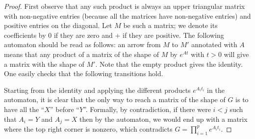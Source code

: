 \documentclass[format=acmsmall, review=false, screen=true]{acmart}
\begin{document}
\begin{proof}
First observe that any such product is always an upper triangular matrix with
non-negative entries (because all the matrices have non-negative entries) and positive
entries on the diagonal. Let $M$ be such a matrix; we denote its coefficients by
$0$ if they are zero and $+$ if they are positive.
The following automaton should be read as follows: an arrow from $M$ to $M'$ annotated with $A$ means that any product
of a matrix of the shape of $M$ by $e^{At}$ with $t>0$ will give a matrix with the shape of $M'$. Note that the empty product gives the identity.
One easily checks that the following transitions hold.
\begin{center}
\end{center}
Starting from the identity and applying the different products $e^{A_{i}t_{i}}$ in the automaton,
it is clear that the only way to reach a matrix of the shape of $G$ is to have all
the ``$X$'' before ``$Y$''. Formally, by contradiction, if there were $i<j$ such
that $A_{i}=Y$ and $A_{j}=X$ then by the automaton, we would end up with a matrix where
the top right corner is nonzero, which contradicts $G=\prod_{i=1}^{p} e^{A_{i} t_{i}}$.
\end{proof}
\end{document}
